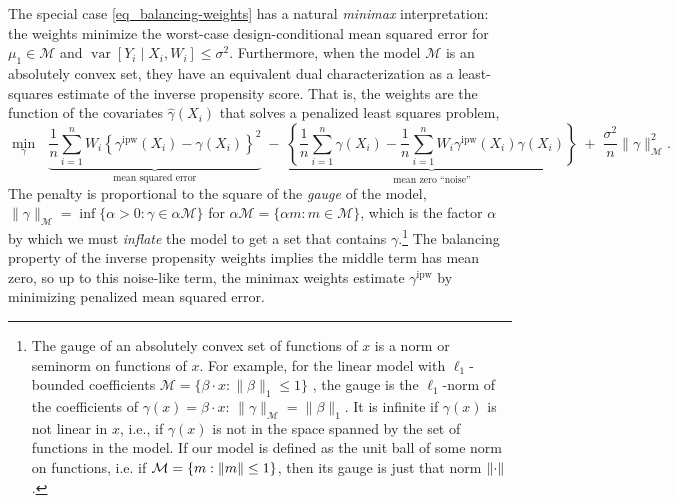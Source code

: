 \documentclass{article}
\DeclarePairedDelimiter\norm{\lVert}{\rVert}
\theoremstyle{definition}
\newcommand{\calM}{\ensuremath{\mathcal{M}}}
\DeclareMathOperator{\Var}{var}
\newcommand{\ipw}{\text{ipw}}
\newcommand{\gammaipw}{\ensuremath{\gamma^{\ipw}}}
\newcommand{\model}{\mathcal{M}}
\newcommand{\<}{\langle}
\renewcommand{\>}{\rangle}
\begin{document}
The special case \eqref{eq_balancing-weights} has a natural \emph{minimax} interpretation: the weights minimize the worst-case
design-conditional mean squared error for $\mu_1 \in \model$
and $\Var[Y_i \mid X_i, W_i] \le \sigma^2$.
Furthermore, when the model $\model$ is an absolutely convex set, they have an equivalent dual characterization
as a least-squares estimate of the inverse propensity score. That is, the weights are the function of the covariates $\hat{\gamma}(X_i)$ that solves a penalized least squares problem,
\begin{equation}
  \label{eq:dual_l2_penalized_regression}
  \min_{\gamma} ~~~\underbrace{\frac{1}{n}\sum_{i=1}^n W_i \left\{\gammaipw(X_i) - \gamma(X_i)\right\}^2}_{\text{mean squared error}} \;-\; \underbrace{\left\{\frac{1}{n}\sum_{i=1}^n\gamma(X_i) - \frac{1}{n}\sum_{i=1}^n W_i \gammaipw(X_i)\gamma(X_i) \right\}}_{\text{mean zero ``noise''}} \;+\; \frac{\sigma^2}{n} \|\gamma\|_\calM^2.
\end{equation}
The penalty is proportional to the square of the
\emph{gauge} of the model, $\|\gamma\|_\model = \inf \{\alpha > 0 : \gamma \in \alpha \model\}$ for $\alpha\model = \{ \alpha m : m \in \model \}$, which is the factor $\alpha$ by which we must \emph{inflate} the model to get a set that contains $\gamma$.\footnote{The gauge of an absolutely convex set of functions of $x$ is a norm or seminorm on functions of $x$. For example, for the linear model with $\ell_1$-bounded coefficients $\model = \{\beta \cdot x : \|\beta\|_1 \leq 1\}$ , the gauge is the $\ell_1$-norm of the coefficients
of $\gamma(x) = \beta \cdot x$:  $\|\gamma\|_\model = \|\beta\|_1$. It is infinite if
$\gamma(x)$ is not linear in $x$, i.e., if $\gamma(x)$ is not in the space spanned by the set of functions in the model. If our model is defined as the unit ball of some norm on functions, i.e. if $\model = \{ m : \norm{m} \le 1 \}$, then its gauge is just that norm $\norm{\cdot}$.}
The balancing property of the inverse propensity weights implies the middle term has mean zero, so up to this noise-like term, the minimax weights estimate $\gammaipw$ by minimizing penalized mean squared error.
\end{document}
